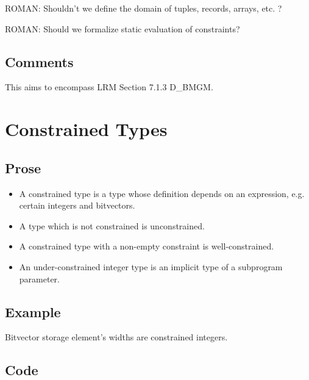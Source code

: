 \documentclass{book}
\begin{document}
\begin{emptytodo}
ROMAN: Shouldn't we define the domain of tuples, records, arrays, etc. ?

ROMAN: Should we formalize static evaluation of constraints?
\end{emptytodo}

  \subsection{Comments}
  This aims to encompass LRM Section 7.1.3 D\_BMGM.

\section{Constrained Types}

\subsection{Prose}
  \begin{itemize}
  \item A constrained type is a type whose definition depends on an expression, e.g. certain integers and bitvectors.
  \item A type which is not constrained is unconstrained.
  \item A constrained type with a non-empty constraint is well-constrained.
  \item An under-constrained integer type is an implicit type of a subprogram parameter.
  \end{itemize}

  \subsection{Example}
    Bitvector storage element’s widths are constrained integers.

  \subsection{Code}
\end{document}
